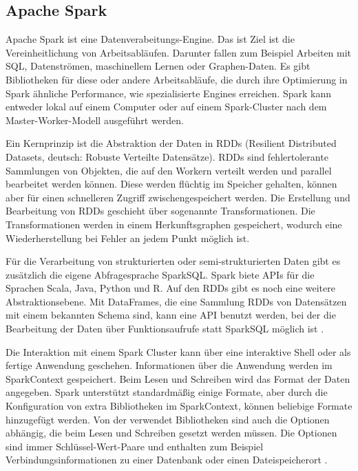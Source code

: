 \subsection{Apache Spark}
\label{sec:spark}

Apache Spark ist eine Datenverabeitungs-Engine.
Das ist Ziel ist die Vereinheitlichung von Arbeitsabläufen.
Darunter fallen zum Beispiel Arbeiten mit SQL, Datenströmen, maschinellem Lernen oder Graphen-Daten.
Es gibt Bibliotheken für diese oder andere Arbeitsabläufe, die durch ihre Optimierung in Spark ähnliche Performance, wie spezialisierte Engines erreichen.
Spark kann entweder lokal auf einem Computer oder auf einem Spark-Cluster nach dem Master-Worker-Modell ausgeführt werden.

Ein Kernprinzip ist die Abstraktion der Daten in RDDs (Resilient Distributed Datasets, deutsch: Robuste Verteilte Datensätze).
RDDs sind fehlertolerante Sammlungen von Objekten, die auf den Workern verteilt werden und parallel bearbeitet werden können.
Diese werden flüchtig im Speicher gehalten, können aber für einen schnelleren Zugriff zwischengespeichert werden.
Die Erstellung und Bearbeitung von RDDs geschieht über sogenannte Transformationen.
Die Transformationen werden in einem Herkunftsgraphen gespeichert, wodurch eine Wiederherstellung bei Fehler an jedem Punkt möglich ist.

Für die Verarbeitung von strukturierten oder semi-strukturierten Daten gibt es zusätzlich die eigene Abfragesprache SparkSQL.
Spark biete APIs für die Sprachen Scala, Java, Python und R.
Auf den RDDs gibt es noch eine weitere Abstraktionsebene.
Mit DataFrames, die eine Sammlung RDDs von Datensätzen mit einem bekannten Schema sind, kann eine API benutzt werden, bei der die Bearbeitung der Daten über Funktionsaufrufe statt SparkSQL möglich ist \parencite{spark}.

Die Interaktion mit einem Spark Cluster kann über eine interaktive Shell oder als fertige Anwendung geschehen.
Informationen über die Anwendung werden im SparkContext gespeichert.
Beim Lesen und Schreiben wird das Format der Daten angegeben.
Spark unterstützt standardmäßig einige Formate, aber durch die Konfiguration von extra Bibliotheken im SparkContext, können beliebige Formate hinzugefügt werden.
Von der verwendet Bibliotheken sind auch die Optionen abhängig, die beim Lesen und Schreiben gesetzt werden müssen.
Die Optionen sind immer Schlüssel-Wert-Paare und enthalten zum Beispiel Verbindungsinformationen zu einer Datenbank oder einen Dateispeicherort \parencite{spark-website}.
